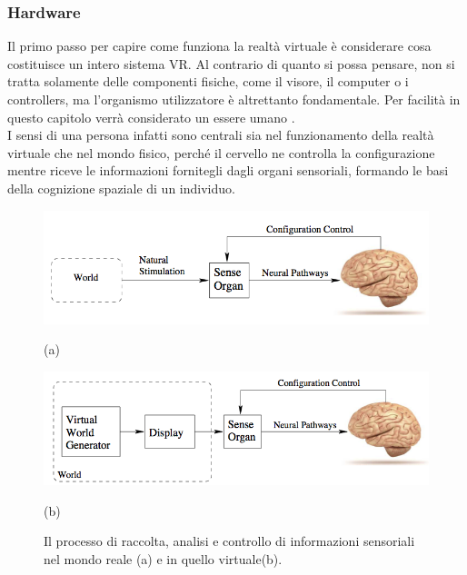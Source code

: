 \subsubsection{Hardware}

Il primo passo per capire come funziona la realtà virtuale è considerare cosa costituisce un intero sistema VR.
Al contrario di quanto si possa pensare, non si tratta solamente delle componenti fisiche, come il visore, il computer o i controllers, ma l'organismo utilizzatore è altrettanto fondamentale. Per facilità in questo capitolo verrà considerato un essere umano .\\
I sensi di una persona infatti sono centrali sia nel funzionamento della realtà virtuale che nel mondo fisico, perché il cervello ne controlla la configurazione mentre riceve le informazioni fornitegli dagli organi sensoriali, formando le basi della cognizione spaziale di un individuo.\\
\begin{figure}[H]
	\centering
	\begin{minipage}[b]{0.49\textwidth}
		\includegraphics[width=\textwidth]{figure/RealityBB}
		{\footnotesize \centerline{(a)} \par}
	\end{minipage}
	\hfill
	\begin{minipage}[b]{0.49\textwidth}
		\includegraphics[width=\textwidth]{figure/VRBB}
			{\footnotesize \centerline{(b)} \par}
	\end{minipage}
	\caption{Il processo di raccolta, analisi e controllo di informazioni sensoriali nel mondo reale (a) e in quello virtuale(b).}
\end{figure}

